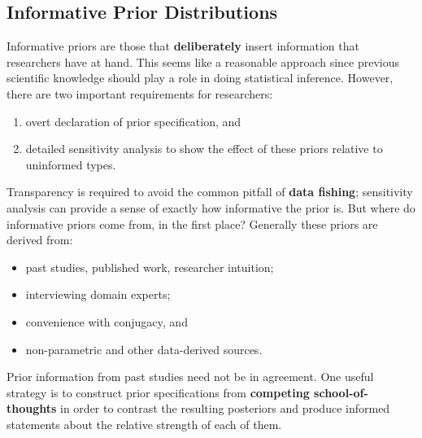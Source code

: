 \subsection{Informative Prior Distributions}
Informative priors are those that \textbf{deliberately} insert information that researchers have at hand.  This seems like a reasonable approach since previous scientific knowledge should play a role in doing statistical inference.  However, there are two important requirements for researchers: \begin{enumerate}[noitemsep]
\item overt declaration of prior specification, and 
\item detailed sensitivity analysis to show the effect of these priors relative to uninformed types.
\end{enumerate}
Transparency is required to avoid the common pitfall of \textbf{data fishing}; sensitivity analysis can provide a sense of exactly how informative the prior is.  
But where do informative priors come from, in the first place? Generally these priors are derived from:
\begin{itemize}[noitemsep]
	\item past studies, published work, researcher intuition;
	\item interviewing domain experts;
	\item convenience with conjugacy, and 
	\item non-parametric and other data-derived sources.
\end{itemize}
Prior information from past studies need not be in agreement. One useful strategy is to construct prior specifications from \textbf{competing school-of-thoughts} in order to contrast the resulting posteriors and produce informed statements about the relative strength of each of them. 

